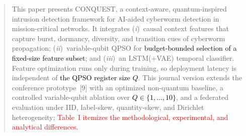 \documentclass[11pt]{article}
\newenvironment{excerpt}{\begin{quote}\sloppy}{\end{quote}}
\begin{document}
\begin{excerpt}
This paper presents CONQUEST, a context-aware, quantum-inspired
intrusion detection framework for AI-aided cyberworm detection in
mission-critical networks. It integrates (\textit{i})~causal context
features that capture burst, dormancy, diversity, and transition cues
of cyberworm propagation; (\textit{ii})~variable-qubit QPSO for
\textcolor{black}{budget-bounded selection of a fixed-size
feature subset}; and (\textit{iii})~an LSTM(+VAE) temporal
classifier. Feature optimization runs only during training, so
deployment latency is independent of \textcolor{black}{the
QPSO register size $Q$}. This journal version extends the conference
prototype~{[9]} with an optimized non-quantum
baseline, a controlled variable-qubit ablation over
\textcolor{black}{$Q\in\{1,\dots,10\}$}, and a federated evaluation
under IID, label-skew, quantity-skew, and Dirichlet heterogeneity;
\textcolor{red}{Table~I itemizes the
methodological, experimental, and analytical differences.}
\end{excerpt}
\setcounter{table}{0}
\end{document}
